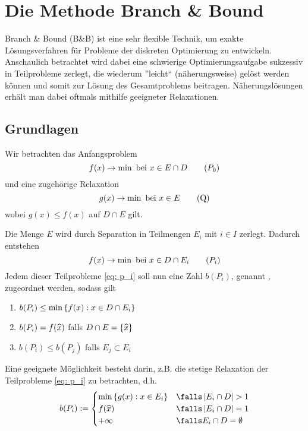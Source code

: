 \section{Die Methode Branch \& Bound}

Branch \& Bound (B\&B) ist eine sehr flexible Technik, um exakte Lösungsverfahren für Probleme der diskreten Optimierung zu entwickeln. Anschaulich betrachtet wird dabei eine schwierige Optimierungsaufgabe sukzessiv in Teilprobleme zerlegt, die wiederum ''leicht`` (näherungsweise) gelöst werden können und somit zur Lösung des Gesamtproblems beitragen. Näherungslösungen erhält man dabei oftmals mithilfe geeigneter Relaxationen.

\subsection{Grundlagen}

Wir betrachten das Anfangsproblem
\begin{equation*}
	f(x) \to \min \text{ bei } x \in E \cap D
	\tag{$P_0$}
	\label{eq: p_0}
\end{equation*}
und eine zugehörige Relaxation
\begin{equation*}
	g(x) \to \min \text{ bei } x \in E
	\tag{Q}
	\label{eq: q}
\end{equation*}
wobei $g(x) \le f(x)$ auf $D \cap E$ gilt.

\vspace{\parskip}

Die Menge $E$ wird durch Separation in Teilmengen $E_i$ mit $i \in I$ zerlegt. Dadurch entstehen  
\begin{equation*}
	f(x) \to \min \text{ bei } x \in D \cap E_i
	\tag{$P_i$}
	\label{eq: p_i}
\end{equation*}
Jedem dieser Teilprobleme \eqref{eq: p_i} soll nun eine Zahl $b(P_i)$, genannt , zugeordnet werden, sodass gilt
\begin{enumerate}[label=(\alph*), nolistsep]
	\item $b(P_i) \le \min\left\{ f(x) : x \in D \cap E_i \right\}$
	\item $b(P_i) = f(\widehat{x})$ falls $D \cap E = \left\{ \widehat{x} \right\}$
	\item $b(P_i) \le b(P_j)$ falls $E_j \subset E_i$
\end{enumerate}

Eine geeignete Möglichkeit besteht darin, z.B. die stetige Relaxation der Teilprobleme \eqref{eq: p_i} zu betrachten, d.h. 
\begin{equation*}
	b(P_i) \defeq \begin{cases}
	\min\menge{g(x) : x \in E_i} & \falls \card{E_i \cap D} > 1 \\
	f(\dach{x}) & \falls \card{E_i \cap D} = 1 \\
	+ \infty & \falls E_i \cap D = \emptyset
	\end{cases}
\end{equation*}

